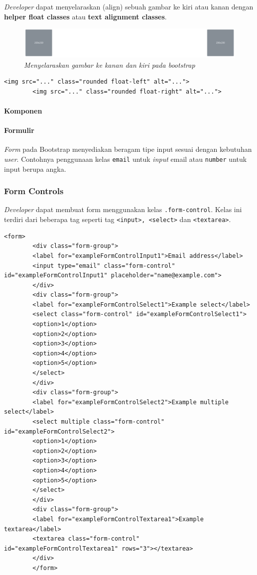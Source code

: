 \documentclass[a4paper,twoside]{article}
\begin{document}
\begin{enumerate}
		\textit{Developer} dapat menyelaraskan (align) sebuah gambar ke kiri atau kanan dengan \textbf{helper float classes} atau \textbf{text alignment classes}. 
		\begin{figure} [H]
			\centering  
			\includegraphics[scale=0.7]{imgalign_bootstrap.PNG}  
			\caption{\it{Menyelaraskan gambar ke kanan dan kiri pada bootstrap}} 
		\end{figure}
		\begin{lstlisting}[frame=single]
		<img src="..." class="rounded float-left" alt="...">
		<img src="..." class="rounded float-right" alt="...">
		\end{lstlisting}
		
		
		
		\paragraph{Komponen}
		\paragraph{Formulir} \par
		\textit{Form} pada Bootstrap menyediakan beragam tipe input sesuai dengan kebutuhan \textit{user}. Contohnya penggunaan kelas \texttt{email} untuk \textit{input} email atau \texttt{number} untuk input berupa angka.
		\subsubsection{Form Controls}
		\textit{Developer} dapat membuat form menggunakan kelas \texttt{.form-control}. Kelas ini terdiri dari beberapa tag seperti tag \texttt{<input>, <select>} dan \texttt{<textarea>}.
		\begin{lstlisting}[frame=single, basicstyle=\tiny] 
		<form>
		<div class="form-group">
		<label for="exampleFormControlInput1">Email address</label>
		<input type="email" class="form-control" id="exampleFormControlInput1" placeholder="name@example.com">
		</div>
		<div class="form-group">
		<label for="exampleFormControlSelect1">Example select</label>
		<select class="form-control" id="exampleFormControlSelect1">
		<option>1</option>
		<option>2</option>
		<option>3</option>
		<option>4</option>
		<option>5</option>
		</select>
		</div>
		<div class="form-group">
		<label for="exampleFormControlSelect2">Example multiple select</label>
		<select multiple class="form-control" id="exampleFormControlSelect2">
		<option>1</option>
		<option>2</option>
		<option>3</option>
		<option>4</option>
		<option>5</option>
		</select>
		</div>
		<div class="form-group">
		<label for="exampleFormControlTextarea1">Example textarea</label>
		<textarea class="form-control" id="exampleFormControlTextarea1" rows="3"></textarea>
		</div>
		</form>
		\end{lstlisting}
		

\end{enumerate}
\end{document}
